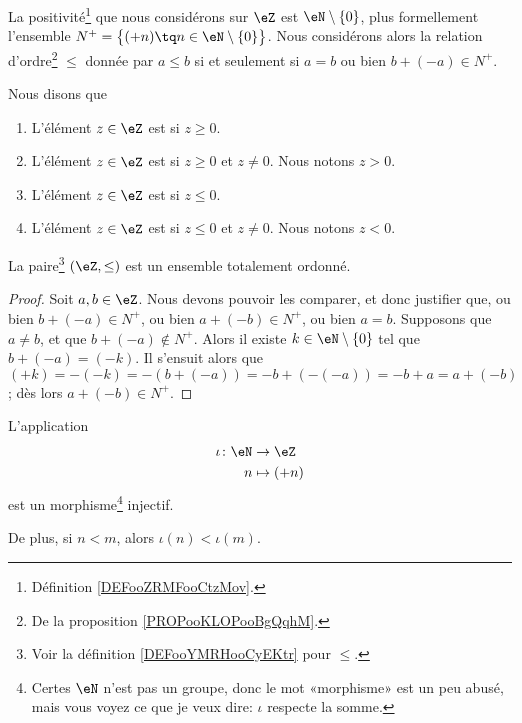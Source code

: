 \begin{definition}	\label{DEFooYMRHooCyEKtr}
	La positivité\footnote{Définition \ref{DEFooZRMFooCtzMov}.} que nous considérons sur \( \eZ\) est \( \eN\setminus\{ 0 \}\), plus formellement l'ensemble \( N^+ = \big\{ (+n) \tq n \in \eN \setminus\{0\}\big\} \). Nous considérons alors la relation d'ordre\footnote{De la proposition \ref{PROPooKLOPooBgQqhM}.} \( \leq\) donnée par \( a\leq b\) si et seulement si \( a = b \) ou bien \( b+(-a)\in N^+\).

	Nous disons que
	\begin{enumerate}
		\item
		      L'élément \( z\in \eZ\) est  si \( z\geq 0\).
		\item
		      L'élément \( z\in \eZ\) est  si \( z\geq 0\) et \( z\neq 0\). Nous notons \( z>0\).
		\item
		      L'élément \( z\in \eZ\) est  si \( z\leq 0\).
		\item
		      L'élément \( z\in \eZ\) est  si \( z\leq 0\) et \( z\neq 0\). Nous notons \( z<0\).
	\end{enumerate}
\end{definition}

\begin{proposition}       \label{PROPooMYYDooOABOdB}
	La paire\footnote{Voir la définition \ref{DEFooYMRHooCyEKtr} pour \( \leq\).} \( (\eZ, \leq)\) est un ensemble totalement ordonné.
\end{proposition}

\begin{proof}
	Soit \( a,b \in \eZ \). Nous devons pouvoir les comparer, et donc justifier que, ou bien \(b+(-a)\in N^+ \), ou bien \( a+(-b)\in N^+ \), ou bien \( a = b \). Supposons que \( a \neq b \), et que \(b+(-a)\notin N^+ \). Alors il existe \( k \in \eN \setminus \{ 0 \} \) tel que \( b+(-a) = (-k) \). Il s'ensuit alors que \( (+k) = -(-k) = -(b+(-a)) = -b+(-(-a)) = -b+a = a+(-b) \); dès lors \( a+(-b)\in N^+ \).
\end{proof}

\begin{proposition}		\label{PROPooCHGRooRksGGO}
	L'application
	\begin{equation}
		\begin{aligned}
			\iota\colon \eN & \to \eZ                    \\
			n               & \mapsto (+n)
		\end{aligned}
	\end{equation}
	est un morphisme\footnote{Certes \( \eN\) n'est pas un groupe, donc le mot «morphisme» est un peu abusé, mais vous voyez ce que je veux dire: \( \iota \) respecte la somme.} injectif.

 	De plus, si \( n < m \), alors \(\iota(n) < \iota(m)\).
\end{proposition}

